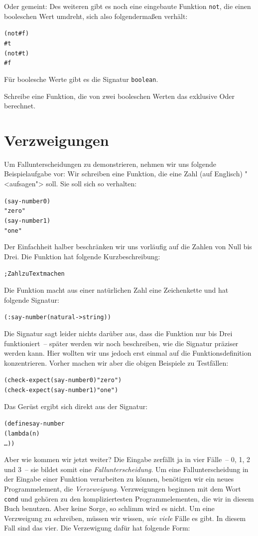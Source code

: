 Oder gemeint: 
Des weiteren gibt es noch eine eingebaute Funktion
\texttt{not}, die einen booleschen Wert
umdreht, sich also folgendermaßen verhält:
%
\begin{alltt}
(not #f)
\evalsto{} #t
(not #t)
\evalsto{} #f
\end{alltt}
%
Für boolesche Werte gibt es die Signatur
\texttt{boolean}.

\begin{aufgabe}
  Schreibe eine Funktion, die von zwei booleschen Werten das exklusive
  Oder berechnet. 
\end{aufgabe}

\section{Verzweigungen}

Um Fallunterscheidungen zu demonstrieren, nehmen wir uns folgende
Beispielaufgabe vor: Wir schreiben eine Funktion, die eine Zahl (auf
Englisch) "<aufsagen"> soll.  Sie soll sich so verhalten:
%
\begin{alltt}
(say-number 0)
\evalsto{} "zero"
(say-number 1)
\evalsto{} "one"
\end{alltt}
%
Der Einfachheit halber beschränken wir uns vorläufig auf die Zahlen
von Null bis Drei.  Die Funktion hat folgende Kurzbeschreibung:
%
\begin{alltt}
; Zahl zu Text machen
\end{alltt}
%
Die Funktion macht aus einer natürlichen Zahl eine Zeichenkette und
hat folgende Signatur:
%
\begin{alltt}
(: say-number (natural -> string))
\end{alltt}
%
Die Signatur sagt leider nichts darüber aus, dass die Funktion nur bis
Drei funktioniert~-- später werden wir noch beschreiben, wie die
Signatur präziser werden kann.  Hier wollten wir uns jedoch erst
einmal auf die Funktionsdefinition konzentrieren.  Vorher machen wir
aber die obigen Beispiele zu Testfällen:
%
\begin{alltt}
(check-expect (say-number 0) "zero")
(check-expect (say-number 1) "one")
\end{alltt}
%
Das Gerüst ergibt sich direkt aus der Signatur:
%
\begin{alltt}
(define say-number
  (lambda (n)
    \ldots))
\end{alltt}
%
Aber wie kommen wir jetzt weiter?  Die Eingabe zerfällt ja in vier
Fälle~-- 0, 1, 2 und 3~-- sie bildet somit eine
\textit{Fallunterscheidung}.  Um eine
Fallunterscheidung in der Eingabe einer Funktion verarbeiten zu können,
benötigen wir ein neues Programmelement, die
\textit{Verzeweigung}.  Verzweigungen beginnen mit
dem Wort \texttt{cond} und gehören zu den kompliziertesten
Programmelementen, die wir in diesem Buch benutzen.  Aber keine Sorge,
so schlimm wird es nicht.  Um eine Verzweigung zu schreiben, müssen
wir wissen, \emph{wie viele} Fälle es gibt.  In diesem Fall sind das
vier.  Die Verzewigung dafür hat folgende Form:
%

